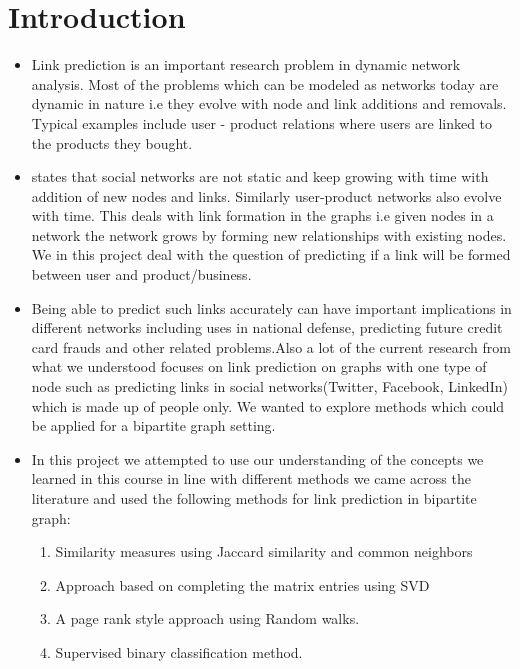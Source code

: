 \documentclass[letterpaper,twocolumn,11pt]{article}
\begin{document}
\section{Introduction}

\begin{itemize}
\item[] Link prediction is an important research problem in dynamic network analysis. Most of the problems which can be modeled as networks today are dynamic in nature i.e they evolve with node and link additions and removals. Typical examples include user - product relations where users are linked to the products they bought.


\item[] \cite{nine} states that social networks are not static and keep growing with time with addition of new nodes and links. Similarly user-product networks also evolve with time. This deals with link formation in the graphs i.e given nodes in a network the network grows by forming new relationships with existing nodes. We in this project deal with the question of predicting if a link will be formed between user and product/business.


\item[] Being able to predict such links accurately can have important implications in different networks including uses in national defense, predicting future credit card frauds and other related problems.Also a lot of the current research from what we understood focuses on link prediction on graphs with one type of node such as predicting links in social networks(Twitter, Facebook, LinkedIn) which is made up of people only. We wanted to explore methods which could be applied for a bipartite graph setting.


\item[] In this project we attempted to use our understanding of the concepts we learned in this course in line with different methods we came across the literature and used the following methods for link prediction in bipartite graph:
\begin{enumerate}
\item Similarity measures using Jaccard similarity and common neighbors
\item Approach based on completing the matrix entries using SVD
\item A page rank style approach using Random walks.
\item Supervised binary classification method.
\end{enumerate}
\end{itemize}
\end{document}
